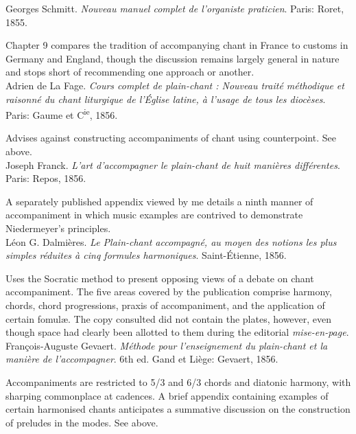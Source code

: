     \parindent=0pt
    \hangindent=0pt
  Georges Schmitt. \emph{Nouveau manuel complet de l'organiste praticien}. Paris:  Roret, 1855.

     \parindent=20pt
     \hangindent=20pt
     Chapter 9 compares the tradition of accompanying chant in France to customs in Germany and England, though the discussion remains largely general in nature and stops short of recommending one approach or another.\\

    \parindent=0pt
    \hangindent=0pt
  Adrien de La Fage. \emph{Cours complet de plain-chant : Nouveau traité méthodique et raisonné du chant liturgique de l'Église latine, à l'usage de tous les diocèses}. Paris:  Gaume et C\textsuperscript{ie}, 1856.

     \parindent=20pt
     \hangindent=20pt
     Advises against constructing accompaniments of chant using counterpoint. See  above.\\

    \parindent=0pt
    \hangindent=0pt
  \covid{}Joseph Franck. \emph{L'art d'accompagner le plain-chant de huit manières différentes}. Paris:  Repos, 1856.

     \parindent=20pt
     \hangindent=20pt
     A separately published appendix viewed by me details a ninth manner of accompaniment in which music examples are contrived to demonstrate Niedermeyer's principles.\\

    \parindent=0pt
    \hangindent=0pt
  Léon G. Dalmières. \emph{Le Plain-chant accompagné, au moyen des notions les plus simples réduites à cinq formules harmoniques}. Saint-Étienne, 1856.

     \parindent=20pt
     \hangindent=20pt
     Uses the Socratic method to present opposing views of a debate on chant accompaniment. The five areas covered by the publication comprise harmony, chords, chord progressions, praxis of accompaniment, and the application of certain fomulæ. The copy consulted did not contain the plates, however, even though space had clearly been allotted to them during the editorial \emph{mise-en-page}.\\

    \parindent=0pt
    \hangindent=0pt
  François-Auguste Gevaert. \emph{Méthode pour l'enseignement du plain-chant et la manière de l'accompagner}. 6th ed. Gand et Liège:  Gevaert, 1856.

     \parindent=20pt
     \hangindent=20pt
     Accompaniments are restricted to 5/3 and 6/3 chords and diatonic harmony, with sharping commonplace at cadences. A brief appendix containing examples of certain harmonised chants anticipates a summative discussion on the construction of preludes in the modes. See  above.\\

